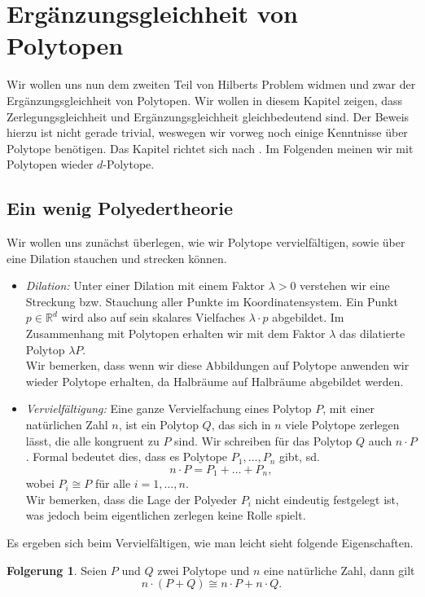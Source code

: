 \documentclass[11pt,titlepage]{article}
\newcommand{\setR}{\mathbb{R}}
\theoremstyle{definition}
\newtheorem{corollary}[theorem]{Folgerung}
\theoremstyle{remark}
\begin{document}
	\section{Ergänzungsgleichheit von Polytopen}
	
	Wir wollen uns nun dem zweiten Teil von Hilberts Problem widmen und zwar der 
	Ergänzungsgleichheit von Polytopen. Wir wollen in diesem Kapitel zeigen, dass 
	Zerlegungsgleichheit und Ergänzungsgleichheit gleichbedeutend sind. Der 
	Beweis hierzu ist nicht gerade trivial, weswegen wir vorweg noch einige 
	Kenntnisse über Polytope benötigen. Das Kapitel richtet sich nach 
	\cite{Hadwiger}. 
	Im Folgenden meinen wir mit Polytopen wieder $d$-Polytope. 
	
	\subsection{Ein wenig Polyedertheorie}
	
	Wir wollen uns zunächst überlegen, wie wir Polytope vervielfältigen, sowie 
	über eine Dilation stauchen und strecken können. 
	
	\begin{itemize}
		\item \textsl{Dilation:} Unter einer Dilation mit einem Faktor $\lambda>0$ 
		verstehen wir eine Streckung bzw. Stauchung aller Punkte 
		im Koordinatensystem. Ein Punkt $p\in\setR^d$ wird also auf 
		sein skalares Vielfaches $\lambda\cdot p$ abgebildet. Im Zusammenhang mit 
		Polytopen erhalten wir mit dem Faktor $\lambda$ das dilatierte Polytop 
		$\lambda P$. \\
		Wir bemerken, dass wenn wir diese Abbildungen auf Polytope anwenden wir wieder Polytope erhalten, da Halbräume auf Halbräume abgebildet werden.
		\item \textsl{Vervielfältigung:} Eine ganze Vervielfachung eines Polytop 
		$P$, mit einer natürlichen Zahl $n$, ist ein Polytop $Q$, 
		das sich in $n$ viele Polytope zerlegen lässt, die alle kongruent zu 
		$P$ sind. Wir schreiben für das Polytop $Q$ auch $n\cdot P$. Formal 
		bedeutet dies, dass es Polytope $P_1,\ldots,P_n$ gibt, sd.
		\[n\cdot P=P_1+\ldots+P_n,\]
		wobei $P_i\cong P$ für alle $i=1,\ldots,n$. \\
		Wir bemerken, dass die Lage der Polyeder $P_i$ nicht eindeutig festgelegt 
		ist, was jedoch beim eigentlichen zerlegen keine Rolle spielt.
	\end{itemize}
	
	Es ergeben sich beim Vervielfältigen, wie man leicht sieht folgende Eigenschaften.
	\begin{corollary} \label{coroll:vervielfältigung}
		Seien $P$ und $Q$ zwei Polytope und $n$ eine natürliche Zahl, dann gilt
		\[n\cdot(P+Q)\cong n\cdot P+n\cdot Q.\]
	\end{corollary}
	
\end{document}
